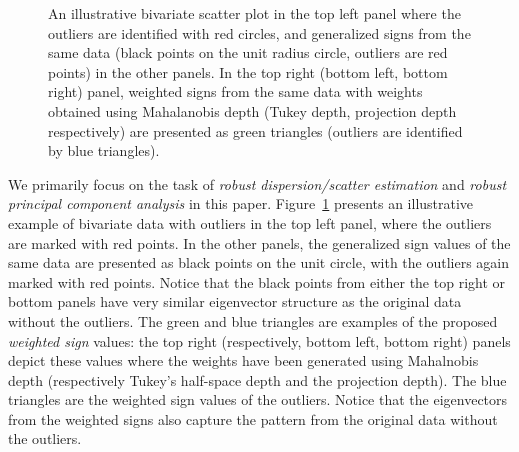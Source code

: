 \begin{figure}[t]
\begin{center}
\begin{tabular}{ll}

\end{tabular}
\caption{
An illustrative bivariate scatter plot in the top left panel where the outliers are 
identified with red circles, 
and generalized signs from the same data (black points on the 
unit radius circle, outliers are red points) in the other panels. 
In the top right (bottom left, bottom right) 
panel, weighted signs from the same data with weights obtained using Mahalanobis depth 
(Tukey depth, projection depth respectively) are presented as green triangles 
(outliers are identified by blue triangles). 
}
\label{fig:Fig1}
\end{center}
\end{figure}

We primarily focus on the task of \textit{robust dispersion/scatter estimation} and 
\textit{robust principal component analysis} in this paper. Figure~\ref{fig:Fig1} presents an illustrative example of bivariate data with outliers in the top left panel, where the outliers are marked with red points. In the 
other panels, the generalized sign values of the same data are presented as black points 
on the unit circle, with the outliers again marked with red points. Notice that the 
black points from either the top right or bottom panels have very similar eigenvector 
structure as the original data without the outliers. The green and blue triangles 
are examples of 
the proposed \textit{weighted sign} values: the top right (respectively, bottom left, 
bottom right) panels depict these values where the weights have been generated using 
Mahalnobis depth (respectively Tukey's half-space depth and the projection depth). The 
blue triangles are the weighted sign values of the outliers. Notice that the eigenvectors 
from the weighted signs also capture the pattern from the original data without the 
outliers.

